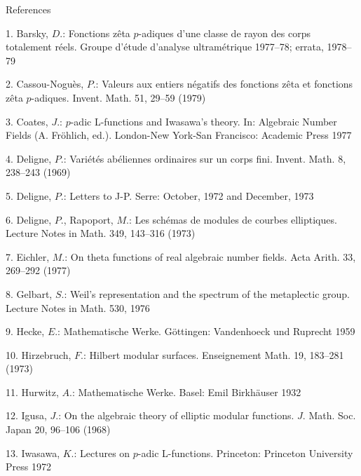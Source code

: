 \documentclass[11pt]{article}
\begin{document}
\par
References\par
\par
1. Barsky, \(D\).: Fonctions zêta \(p\)-adiques d’une classe de rayon des corps totalement réels. Groupe d’étude d’analyse ultramétrique 1977--78; errata, 1978--79\par
\par
2. Cassou-Noguès, \(P\).: Valeurs aux entiers négatifs des fonctions zêta et fonctions zêta \(p\)-adiques. Invent. Math. 51, 29--59 (1979)\par
\par
3. Coates, \(J\).: \(p\)-adic L-functions and Iwasawa’s theory. In: Algebraic Number Fields (A. Fröhlich, ed.). London-New York-San Francisco: Academic Press 1977\par
\par
4. Deligne, \(P\).: Variétés abéliennes ordinaires sur un corps fini. Invent. Math. 8, 238--243 (1969)\par
\par
5. Deligne, \(P\).: Letters to J-P. Serre: October, 1972 and December, 1973\par
\par
6. Deligne, \(P\)., Rapoport, \(M\).: Les schémas de modules de courbes elliptiques. Lecture Notes in Math. 349, 143--316 (1973)\par
\par
7. Eichler, \(M\).: On theta functions of real algebraic number fields. Acta Arith. 33, 269--292 (1977)\par
\par
8. Gelbart, \(S\).: Weil’s representation and the spectrum of the metaplectic group. Lecture Notes in Math. 530, 1976\par
\par
9. Hecke, \(E\).: Mathematische Werke. Göttingen: Vandenhoeck und Ruprecht 1959\par
\par
10. Hirzebruch, \(F\).: Hilbert modular surfaces. Enseignement Math. 19, 183--281 (1973)\par
\par
11. Hurwitz, \(A\).: Mathematische Werke. Basel: Emil Birkhäuser 1932\par
\par
12. Igusa, \(J\).: On the algebraic theory of elliptic modular functions. \(J\). Math. Soc. Japan 20, 96--106 (1968)\par
\par
13. Iwasawa, \(K\).: Lectures on \(p\)-adic L-functions. Princeton: Princeton University Press 1972\par
\end{document}
